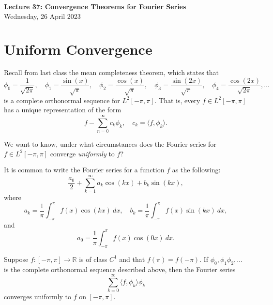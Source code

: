 \documentclass[11pt]{article}
\theoremstyle{definition}
\newcommand{\R}{\mathbb{R}}                      %
\begin{document}
\thispagestyle{empty}

\begin{center}
{\LARGE \bf Lecture 37: Convergence Theorems for Fourier Series}\\
{\large Wednesday, 26 April 2023}\\
\end{center}

\section{Uniform Convergence}
Recall from last class the mean completeness theorem, which states that
$$
\phi_0 = \frac{1}{\sqrt{2\pi}},\quad \phi_1=\frac{\sin(x)}{\sqrt{\pi}},\quad \phi_2 = \frac{\cos(x)}{\sqrt{\pi}},\quad\phi_3=\frac{\sin(2x)}{\sqrt{\pi}},\quad \phi_4=\frac{\cos(2x)}{\sqrt{2\pi}},\dots
$$
is a complete orthonormal sequence for $L^2[-\pi,\pi]$. That is, every $f\in L^2[-\pi,\pi]$ has a unique representation of the form 
$$
f-\sum_{n=0}^\infty c_k\phi_k, \quad c_k=\langle f,\phi_k\rangle.
$$

We want to know, under what circumstances does the Fourier series for $f\in L^2[-\pi,\pi]$ converge \textit{uniformly} to $f$? 

\note It is common to write the Fourier series for a function $f$ as the following:
$$
\frac{a_0}{2}+\sum_{k=1}^\infty a_k\cos(kx)+b_k\sin(kx),
$$
where 
$$
a_k = \frac{1}{\pi}\int_{-\pi}^\pi f(x)\cos(kx)~dx,\quad b_k=\frac{1}{\pi}\int_{-\pi}^\pi f(x)\sin(kx)~dx,
$$
and 
$$
a_0=\frac{1}{\pi}\int_{-\pi}^{\pi} f(x)\cos(0x)~dx.
$$

\prop Suppose $f:[-\pi,\pi ]\to\R$ is of class $C^1$ and that $f(\pi)=f(-\pi)$. If $\phi_0,\phi_1\phi_2,\dots$ is the complete orthonormal sequence described above, then the Fourier series 
$$
\sum_{k=0}^\infty \langle f,\phi_k\rangle \phi_k
$$
converges uniformly to $f$ on $[-\pi,\pi]$.
\end{document}
